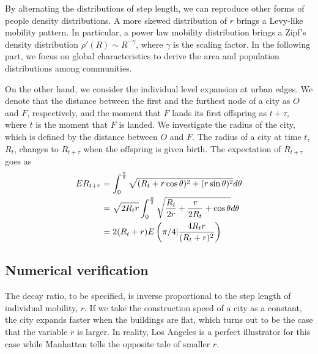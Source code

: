 \documentclass[aps,prl]{revtex4-2}
\begin{document}
By alternating the distributions of step length, we can reproduce other forms of people density distributions. A more skewed distribution of $r$ brings a Levy-like mobility pattern. In particular, a power law mobility distribution brings a Zipf's density distribution $\rho '(R)\sim R^{-\gamma}$\cite{PhysRevX.4.011008}, where $\gamma$ is the scaling factor.  In the following part, we focus on global characteristics to derive the area and population distributions among communities.

On the other hand, we consider the individual level expansion at urban edges. We denote that the distance between the first and the furthest node of a city as $O$ and $F$, respectively, and the moment that $F$ lands its first offspring as $t+\tau$, where $t$ is the moment that $F$ is landed. We investigate the radius of the city, which is defined by the distance between $O$ and $F$. The radius of a city at time $t$, $R_t$, changes to $R_{t+\tau}$ when the offspring is given birth. The expectation of $R_{t+\tau}$ goes as 
\begin{align}
	E R_{t+\tau} &= \int_0^{\frac{\pi}{2}} \sqrt{(R_t+r\cos\theta)^2+(r\sin\theta)^2} d\theta \notag \\
	&= \sqrt{2 R_t r} \int_{0}^{\frac{\pi}{2}} \sqrt{\frac{R_{t}}{2 r}+\frac{r}{2 R_{t}}+\cos \theta} d \theta \notag\\
	&= 2(R_t+r) E\left(\pi/4| \frac{4R_t r}{(R_t+r)^2}\right)
\end{align}

\subsection{Numerical verification}

The decay ratio, to be specified, is inverse proportional to the step length of individual mobility, $r$. If we take the construction speed of a city as a constant, the city expands faster when the buildings are flat, which turns out to be the case that the variable $r$ is larger. In reality, Los Angeles is a perfect illustrator for this case while Manhattan tells the opposite tale of smaller $r$.
\end{document}
